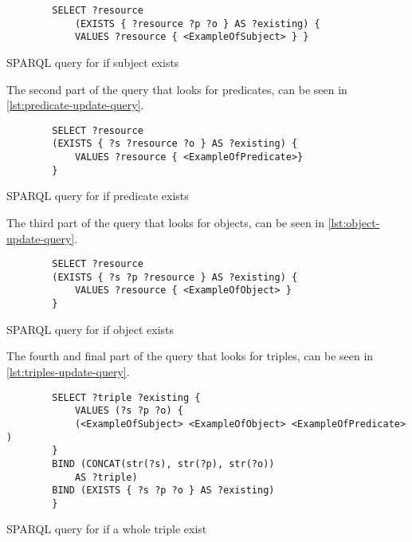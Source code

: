 \begin{listing}[htb!]
    \begin{verbatim}          
        SELECT ?resource
            (EXISTS { ?resource ?p ?o } AS ?existing) {
            VALUES ?resource { <ExampleOfSubject> } }
    \end{verbatim}
    \caption{SPARQL query for if subject exists}
    \label{lst:subject-update-query}
\end{listing}

The second part of the query that looks for predicates, can be seen in \autoref{lst:predicate-update-query}.
\begin{listing}[htb!]
    \begin{verbatim}          
        SELECT ?resource 
        (EXISTS { ?s ?resource ?o } AS ?existing) { 
            VALUES ?resource { <ExampleOfPredicate>}
        } 
    \end{verbatim}
    \caption{SPARQL query for if predicate exists}
    \label{lst:predicate-update-query}
\end{listing}


The third part of the query that looks for objects, can be seen in \autoref{lst:object-update-query}.

\begin{listing}[htb!]
    \begin{verbatim}          
        SELECT ?resource 
        (EXISTS { ?s ?p ?resource } AS ?existing) { 
            VALUES ?resource { <ExampleOfObject> } 
        }
    \end{verbatim}
    \caption{SPARQL query for if object exists}
    \label{lst:object-update-query}
\end{listing}

The fourth and final part of the query that looks for triples, can be seen in \autoref{lst:triples-update-query}.

\begin{listing}[htb!]
    \begin{verbatim}          
        SELECT ?triple ?existing { 
            VALUES (?s ?p ?o) {  
            (<ExampleOfSubject> <ExampleOfObject> <ExampleOfPredicate> ) 
        }
        BIND (CONCAT(str(?s), str(?p), str(?o)) 
            AS ?triple)
        BIND (EXISTS { ?s ?p ?o } AS ?existing)
        }
    \end{verbatim}
    \caption{SPARQL query for if a whole triple exist}
    \label{lst:triples-update-query}
\end{listing}

